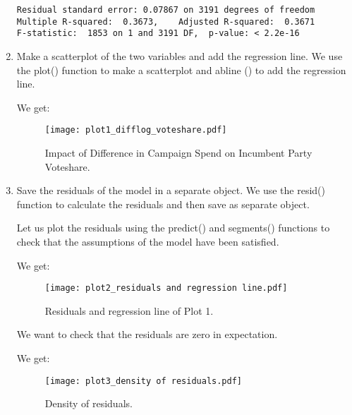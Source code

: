 \documentclass[12pt,letterpaper]{article}
\begin{document}
\begin{enumerate}
\begin{verbatim}
Residual standard error: 0.07867 on 3191 degrees of freedom
Multiple R-squared:  0.3673,	Adjusted R-squared:  0.3671 
F-statistic:  1853 on 1 and 3191 DF,  p-value: < 2.2e-16
\end{verbatim}
		\item Make a scatterplot of the two variables and add the regression line. 	\vspace{7cm}
\noindent We use the plot() function to make a scatterplot and abline () to add the regression line.
\vspace{.5cm}
  
\vspace{.5cm}   
\noindent We get:
\begin{figure}[hbtp!]\centering
	\caption{\footnotesize Impact of Difference in Campaign Spend on Incumbent Party Voteshare.}
	\label{fig:plot_1}
	\texttt{[image: plot1\_difflog\_voteshare.pdf]}
\end{figure}
		\item Save the residuals of the model in a separate object.	\vspace{7cm}
\noindent We use the resid() function to calculate the residuals and then save as separate object.
\vspace{.5cm}
  
\vspace{.5cm}   
\noindent Let us plot the residuals using the predict() and segments() functions to check that the assumptions of the model have been satisfied.
\vspace{.5cm}
  
\vspace{.5cm}   
\noindent We get:
\begin{figure}[hbtp!]\centering
	\caption{\footnotesize Residuals and regression line of Plot 1.}
	\label{fig:plot_2}
	\texttt{[image: plot2\_residuals and regression line.pdf]}
\end{figure}
\noindent We want to check that the residuals are zero in expectation.
\vspace{.5cm}
  
\vspace{.5cm}  
\noindent We get:
\begin{figure}[hbtp!]\centering
	\caption{\footnotesize Density of residuals.}
	\label{fig:plot_3}
	\texttt{[image: plot3\_density of residuals.pdf]}

\end{figure}
\end{enumerate}
\end{document}
